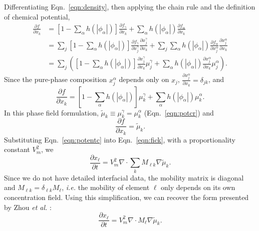 \documentclass[10pt]{article}
\begin{document}
		Differentiating Eqn.~\ref{eqn:density}, then applying the chain rule and the definition of chemical potential,
		\begin{align}
			\frac{\partial f}{\partial x_k} &= \left[1-\sum_{\alpha}h(|\phi_{\alpha}|)\right]\frac{\partial f_{\gamma}}{\partial x_k}
			                                 + \sum_{\alpha}h(|\phi_{\alpha}|)\frac{\partial f_{\alpha}}{\partial x_k}\\
			                                &= \sum_j\left[1-\sum_{\alpha}h(|\phi_{\alpha}|)\right]\frac{\partial f_{\gamma}}{\partial x_j^{\gamma}}\frac{\partial x_j^{\gamma}}{\partial x_k}
			                                 + \sum_j\sum_{\alpha}h(|\phi_{\alpha}|)\frac{\partial f_{\alpha}}{\partial x_j^{\alpha}}\frac{\partial x_j^{\alpha}}{\partial x_k}\\
			                                &= \sum_j\left(\left[1-\sum_{\alpha}h(|\phi_{\alpha}|)\right]\frac{\partial x_j^{\gamma}}{\partial x_k}\mu_j^{\gamma}
			                                 + \sum_{\alpha}h(|\phi_{\alpha}|)\frac{\partial x_j^{\alpha}}{\partial x_k}\mu_j^{\alpha}\right).
		\end{align}
		Since the pure-phase composition $x_j^{\alpha}$ depends only on $x_j$, $\frac{\partial x_j^{\alpha}}{\partial x_k} = \delta_{jk}$, and
		\begin{equation}
			\frac{\partial f}{\partial x_k} = \left[1-\sum_{\alpha}h(|\phi_{\alpha}|)\right]\mu_k^{\gamma} + \sum_{\alpha}h(|\phi_{\alpha}|)\mu_k^{\alpha}.
		\end{equation}
		In this phase field formulation, $\tilde{\mu}_k\equiv\mu_k^{\gamma}=\mu_k^{\alpha}$ (Eqn.~\ref{eqn:potcr}) and
		\begin{equation}
			\frac{\partial f}{\partial x_k} = \tilde{\mu}_k.\label{eqn:potentc}
		\end{equation}
		Substituting Eqn.~\ref{eqn:potentc} into Eqn.~\ref{eqn:fick}, with a proportionality constant $V_m^2$, we 
		\begin{equation}
			\frac{\partial x_{\ell}}{\partial t} = V_m^2 \nabla\cdot\sum_k M_{\ell k}\nabla\tilde{\mu}_k.
		\end{equation}
		Since we do not have detailed interfacial data, the mobility matrix is diagonal and $M_{\ell k} = \delta_{\ell k}M_{\ell}$,
		\emph{i.e.} the mobility of element $\ell$ only depends on its own concentration field.
		Using this simplification, we can recover the form presented by Zhou \emph{et al.} \cite{Zhou2014}:
		\begin{equation}
			\frac{\partial x_{\ell}}{\partial t} = V_m^2 \nabla \cdot M_{\ell} \nabla \tilde{\mu}_k.\label{eqn:zhoudiff}
		\end{equation}
\end{document}
